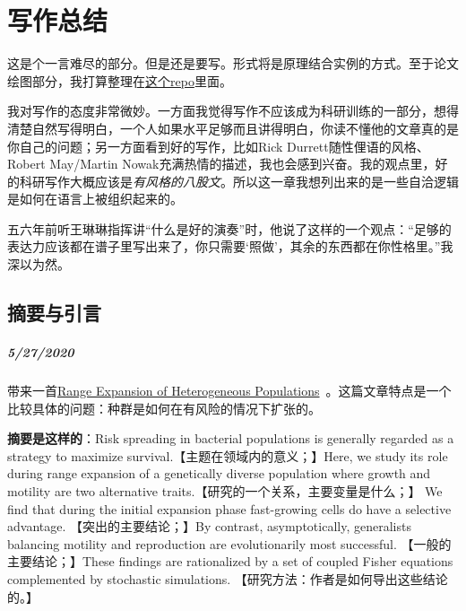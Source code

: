 \chapter{写作总结}

这是个一言难尽的部分。但是还是要写。形式将是原理结合实例的方式。至于论文绘图部分，我打算整理在\href{https://github.com/GXIU/Easy-Templates}{这个repo}里面。

我对写作的态度非常微妙。一方面我觉得写作不应该成为科研训练的一部分，想得清楚自然写得明白，一个人如果水平足够而且讲得明白，你读不懂他的文章真的是你自己的问题；另一方面看到好的写作，比如Rick Durrett随性俚语的风格、Robert May/Martin Nowak充满热情的描述，我也会感到兴奋。我的观点里，好的科研写作大概应该是\emph{有风格的八股文}。所以这一章我想列出来的是一些自洽逻辑是如何在语言上被组织起来的。

五六年前听王琳琳指挥讲“什么是好的演奏”时，他说了这样的一个观点：“足够的表达力应该都在谱子里写出来了，你只需要‘照做’，其余的东西都在你性格里。”我深以为然。

\section{摘要与引言}

\paragraph{5/27/2020} 带来一首\href{http://dx.doi.org/10.1103/PhysRevLett.112.148103}{Range Expansion of Heterogeneous Populations}~\cite{PhysRevLett.112.148103}。这篇文章特点是一个比较具体的问题：种群是如何在有风险的情况下扩张的。

\textbf{摘要是这样的}：Risk spreading in bacterial populations is generally regarded as a strategy to maximize survival.【主题在领域内的意义；】Here, we study its role during range expansion of a genetically diverse population where growth and motility are two alternative traits.【研究的一个关系，主要变量是什么；】 We find that during the initial expansion phase fast-growing cells do have a selective advantage. 【突出的主要结论；】By contrast, asymptotically, generalists balancing motility and reproduction are evolutionarily most successful. 【一般的主要结论；】These findings are rationalized by a set of coupled Fisher equations complemented by stochastic simulations. 【研究方法：作者是如何导出这些结论的。】

